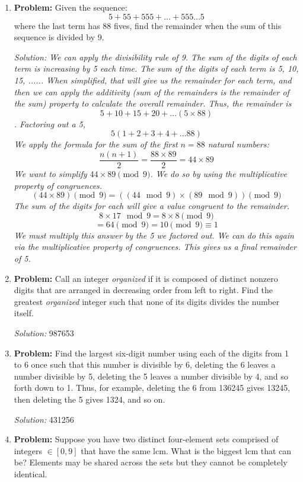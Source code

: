 \documentclass{article}
\begin{document}
\begin{enumerate}
    \item \textbf{Problem:} 
    Given the sequence:
    \[ 5 + 55 + 555 + \ldots + 555\ldots5 \]
    where the last term has 88 fives, find the remainder when the sum of this sequence is divided by 9.

    \textit{Solution: We can apply the divisibility rule of 9. The sum of the digits of each term is increasing by 5 each time. The sum of the digits of each term is 5, 10, 15, ...... When simplified, that will give us the remainder for each term, and then we can apply the additivity (sum of the remainders is the remainder of the sum) property to calculate the overall remainder. 
    Thus, the remainder is $$5+10+15+20+\ldots(5\times88)$$.
    Factoring out a 5, $$5(1+2+3+4+\ldots88)$$
    We apply the formula for the sum of the first $n=88$ natural numbers:
    $$\frac{n(n+1)}{2} = \frac{88\times89}{2} = 44\times89$$
    We want to simplify $44\times89 \pmod{9}$. We do so by using the multiplicative property of congruences. 
    $$(44 \times 89) \pmod{9} = ((44 \mod{9}) \times (89 \mod{9})) \pmod{9}$$
    The sum of the digits for each will give a value congruent to the remainder. $$8\times17\mod{9} = 8\times8 \pmod{9}$$
    $$ = 64 \pmod{9} = 10 \pmod{9} \equiv 1$$
    We must multiply this answer by the 5 we factored out. We can do this again via the multiplicative property of congruences. This gives us a final remainder of 5.
    }

    \item \textbf{Problem:} 
    Call an integer \textit{organized} if it is composed of distinct nonzero digits that are arranged in decreasing order from left to right. Find the greatest \textit{organized} integer such that none of its digits divides the number itself.

    \textit{Solution:} 987653

    \item \textbf{Problem:} 
    Find the largest six-digit number using each of the digits from 1 to 6 once such that this number is divisible by 6, deleting the 6 leaves a number divisible by 5, deleting the 5 leaves a number divisible by 4, and so forth down to 1. Thus, for example, deleting the 6 from 136245 gives 13245, then deleting the 5 gives 1324, and so on.

    \textit{Solution:} 431256 

    \item \textbf{Problem:}
    Suppose you have two distinct four-element sets comprised of integers $\in[0, 9]$ that have the same lcm. What is the biggest lcm that can be? Elements may be shared across the sets but they cannot be completely identical. 


\end{enumerate}
\end{document}
